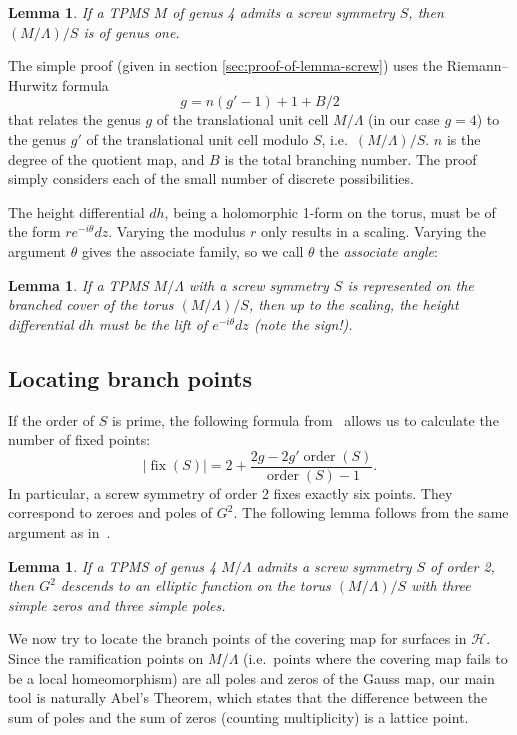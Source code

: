 \documentclass[a4paper]{amsart}
\theoremstyle{plain}
\newtheorem{lemma}[theorem]{Lemma}
\theoremstyle{definition}
\def \cH {\mathcal{H}}
\begin{document}
\begin{lemma}
  \label{lemma:screw-symmetry}
	If a TPMS $M$ of genus 4 admits a screw symmetry $S$, then $(M/\Lambda)/S$
	is of genus one.
\end{lemma}


The simple proof (given in section \ref{sec:proof-of-lemma-screw}) uses the
Riemann--Hurwitz formula
\[
	g = n(g' - 1) + 1 + B/2
\]
that relates the genus $g$ of the translational unit cell $M/\Lambda$ (in our
case $g=4$) to the genus $g'$ of the translational unit cell modulo $S$, i.e.\
$(M/\Lambda)/S$. $n$ is the degree of the quotient map, and $B$ is the total
branching number. The proof simply considers each of the small number of
discrete possibilities. 

The height differential $dh$, being a holomorphic 1-form on the torus, must be
of the form $r e^{-i\theta} dz$.  Varying the modulus $r$ only results in a
scaling.  Varying the argument $\theta$ gives the associate family, so we call
$\theta$ the \textit{associate angle}:

\begin{lemma}\label{lem:dh}
	If a TPMS $M/\Lambda$ with a screw symmetry $S$ is represented on the
	branched cover of the torus $(M/\Lambda)/S$, then up to the scaling, the
	height differential $dh$ must be the lift of $e^{-i\theta}dz$ (note the
	sign!).
\end{lemma}


\subsection{Locating branch points}

If the order of $S$ is prime, the following formula
from~\cite{farkas1992} allows us to calculate the number of fixed points: 
\[
	|\operatorname{fix}(S)| = 2 + \frac{2g - 2g'\operatorname{order}(S)}{\operatorname{order}(S) - 1}.
\]
In particular, a screw symmetry of order 2 fixes exactly six points.  They
correspond to zeroes and poles of $G^2$.  The following lemma follows from the
same argument as in~\cite[Lemmas~3.9, 3.13]{weyhaupt2006}.

\begin{lemma}
	If a TPMS of genus 4 $M/\Lambda$ admits a screw symmetry $S$ of order 2, then
	$G^2$ descends to an elliptic function on the torus $(M/\Lambda)/S$ with
	three simple zeros and three simple poles.
\end{lemma}

We now try to locate the branch points of the covering map for surfaces in
$\cH$.  Since the ramification points on $M/\Lambda$ (i.e.\ points where the
covering map fails to be a local homeomorphism) are all poles and zeros of the
Gauss map, our main tool is naturally Abel's Theorem, which states that the
difference between the sum of poles and the sum of zeros (counting
multiplicity) is a lattice point.
\end{document}
